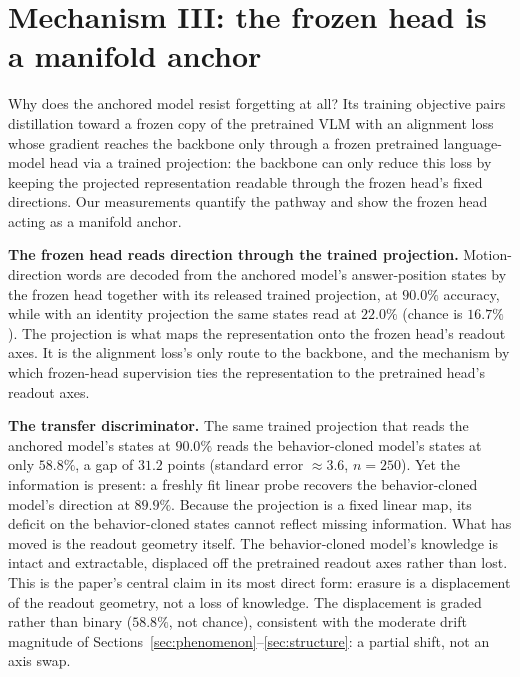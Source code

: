 \documentclass{article}
\begin{document}
\section{Mechanism III: the frozen head is a manifold anchor}
\label{sec:frozenhead}

Why does the anchored model resist forgetting at all? Its training objective pairs
distillation toward a frozen copy of the pretrained VLM with an alignment loss whose
gradient reaches the backbone only through a frozen pretrained language-model head via a
trained projection: the backbone can only reduce this loss by keeping the projected
representation readable through the frozen head's fixed directions. Our measurements
quantify the pathway and show the frozen head acting as a manifold anchor.

\textbf{The frozen head reads direction through the trained projection.} Motion-direction
words are decoded from the anchored model's answer-position states by the frozen head
together with its released trained projection, at $90.0\%$ accuracy, while with an identity
projection the same states read at $22.0\%$ (chance is $16.7\%$). The projection is what
maps the representation onto the frozen head's readout axes. It is the alignment loss's only
route to the backbone, and the mechanism by which frozen-head supervision ties the
representation to the pretrained head's readout axes.

\textbf{The transfer discriminator.} The same trained projection that reads the anchored
model's states at $90.0\%$ reads the behavior-cloned model's states at only $58.8\%$, a
gap of $31.2$ points (standard error $\approx 3.6$, $n = 250$). Yet the information is
present: a freshly fit linear probe recovers the behavior-cloned model's direction at
$89.9\%$. Because the projection is a fixed linear map, its deficit on the behavior-cloned
states cannot reflect missing information. What has moved is the readout geometry
itself. The behavior-cloned model's knowledge is intact and extractable, displaced off the
pretrained readout axes rather than lost. This is the paper's central claim in its most
direct form: erasure is a displacement of the readout geometry, not a loss of knowledge.
The displacement is graded rather than binary ($58.8\%$, not chance), consistent with the
moderate drift magnitude of Sections~\ref{sec:phenomenon}--\ref{sec:structure}: a partial
shift, not an axis swap.
\end{document}
